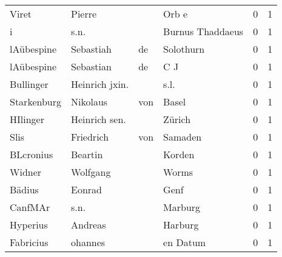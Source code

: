 \begin{center}
\begin{tiny}
\begin{longtabu}{llllrr}
                    Viret &                             Pierre &             &                                       Orb e &          0 &         1 \\
                        i &                               s.n. &             &                            Burnus Thaddaeus &          0 &         1 \\
               lAübespine &                          Sebastiah &          de &                                   Solothurn &          0 &         1 \\
               lAübespine &                          Sebastian &          de &                                         C J &          0 &         1 \\
                Bullinger &                     Heinrich jxin. &             &                                        s.l. &          0 &         1 \\
              Starkenburg &                           Nikolaus &         von &                                       Basel &          0 &         1 \\
                 HIlinger &                      Heinrich sen. &             &                                      Zürich &          0 &         1 \\
                     Slis &                          Friedrich &         von &                                     Samaden &          0 &         1 \\
                BLcronius &                            Beartin &             &                                      Korden &          0 &         1 \\
                   Widner &                           Wolfgang &             &                                       Worms &          0 &         1 \\
                   Bädius &                             Eonrad &             &                                        Genf &          0 &         1 \\
                  CanfMAr &                               s.n. &             &                                     Marburg &          0 &         1 \\
                 Hyperius &                            Andreas &             &                                     Harburg &          0 &         1 \\
                Fabricius &                            ohannes &             &                                    en Datum &          0 &         1 \\

\end{longtabu}
\end{tiny}
\end{center}
